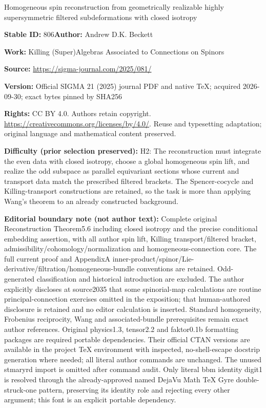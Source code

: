 \documentclass[11pt]{article}
\numberwithin{equation}{section}
\numberwithin{equation}{section}
\newcommand{\1}{\mathbbm{1}}
\begin{document}
\begin{center}\Large Homogeneous spin reconstruction from geometrically realizable highly supersymmetric filtered subdeformations with closed isotropy\end{center}
\noindent\textbf{Stable ID:} 806\quad\textbf{Author:} Andrew D.K. Beckett\par
\noindent\textbf{Work:} Killing (Super)Algebras Associated to Connections on Spinors\par
\noindent\textbf{Source:} \url{https://sigma-journal.com/2025/081/}\par
\noindent\textbf{Version:} Official SIGMA 21 (2025) journal PDF and native TeX; acquired 2026-09-30; exact bytes pinned by SHA256\par
\noindent\textbf{Rights:} CC BY 4.0. Authors retain copyright. \url{https://creativecommons.org/licenses/by/4.0/}. Reuse and typesetting adaptation; original language and mathematical content preserved.\par
\noindent\textbf{Difficulty (prior selection preserved):} {\CJKfont H2: The reconstruction must integrate the even data with closed isotropy, choose a global homogeneous spin lift, and realize the odd subspace as parallel equivariant sections whose current and transport data match the prescribed filtered brackets. The Spencer-cocycle and Killing-transport constructions are retained, so the task is more than applying Wang’s theorem to an already constructed background.}\par
\medskip\noindent\textbf{Editorial boundary note (not author text):} Complete original Reconstruction Theorem5.6 including closed isotropy and the precise conditional embedding assertion, with all author spin lift, Killing transport/filtered bracket, admissibility/cohomology/normalization and homogeneous-connection core. The full current proof and AppendixA inner-product/spinor/Lie-derivative/filtration/homogeneous-bundle conventions are retained. Odd-generated classification and historical introduction are excluded. The author explicitly discloses at source2035 that some spinorial-map calculations are routine principal-connection exercises omitted in the exposition; that human-authored disclosure is retained and no editor calculation is inserted. Standard homogeneity, Frobenius reciprocity, Wang and associated-bundle prerequisites remain exact author references. Original physics1.3, tensor2.2 and faktor0.1b formatting packages are required portable dependencies. Their official CTAN versions are available in the project TeX environment with inspected, no-shell-escape docstrip generation where needed; all literal author commands are unchanged. The unused stmaryrd import is omitted after command audit. Only literal bbm identity digit1 is resolved through the already-approved named DejaVu Math TeX Gyre double-struck-one pattern, preserving its identity role and rejecting every other argument; this font is an explicit portable dependency.\par
\end{document}
